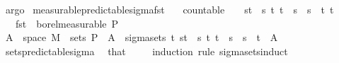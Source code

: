 \begin{isabellebody}
\ argo\isanewline
{}\isamarkupfalse%
%
\endisatagproof
{\isafoldproof}%
%
\isadelimproof
\isanewline
%
\endisadelimproof
\isanewline
{}\isamarkupfalse%
\ measurable{\isacharunderscore}{\kern0pt}predictable{\isacharunderscore}{\kern0pt}sigma{\isacharunderscore}{\kern0pt}fst{\isacharcolon}{\kern0pt}\isanewline
\ \ \ {\isachardoublequoteopen}countable\ {\isasymI}{\isachardoublequoteclose}\ {\isachardoublequoteopen}{\isasymI}\ {\isasymsubseteq}\ {\isacharbraceleft}{\kern0pt}{\isacharbraceleft}{\kern0pt}s{\isacharless}{\kern0pt}{\isachardot}{\kern0pt}{\isachardot}{\kern0pt}t{\isacharbraceright}{\kern0pt}\ {\isacharbar}{\kern0pt}\ s\ t{\isachardot}{\kern0pt}\ t\ {\isasymle}\ s\ {\isasymand}\ s\ {\isacharless}{\kern0pt}\ t{\isacharbraceright}{\kern0pt}{\isachardoublequoteclose}\ {\isachardoublequoteopen}{\isacharbraceleft}{\kern0pt}t\ {\isasymsubseteq}\ {\isacharparenleft}{\kern0pt}{\isasymUnion}{\isasymI}{\isacharparenright}{\kern0pt}{\isachardoublequoteclose}\isanewline
\ \ \ {\isachardoublequoteopen}fst\ {\isasymin}\ borel{\isacharunderscore}{\kern0pt}measurable\ {\isasymSigma}\isactrlsub P{\isachardoublequoteclose}\isanewline
%
\isadelimproof
%
\endisadelimproof
%
\isatagproof
{}\isamarkupfalse%
\ {\isacharminus}{\kern0pt}\isanewline
\ \ \isamarkupfalse%
\ {\isachardoublequoteopen}A\ {\isasymtimes}\ space\ M\ {\isasymin}\ sets\ {\isasymSigma}\isactrlsub P{\isachardoublequoteclose}\ \ {\isachardoublequoteopen}A\ {\isasymin}\ sigma{\isacharunderscore}{\kern0pt}sets\ {\isacharbraceleft}{\kern0pt}t\ {\isacharbraceleft}{\kern0pt}{\isacharbraceleft}{\kern0pt}s{\isacharless}{\kern0pt}{\isachardot}{\kern0pt}{\isachardot}{\kern0pt}t{\isacharbraceright}{\kern0pt}\ {\isacharbar}{\kern0pt}\ s\ t{\isachardot}{\kern0pt}\ t\ {\isasymle}\ s\ {\isasymand}\ s\ {\isacharless}{\kern0pt}\ t{\isacharbraceright}{\kern0pt}{\isachardoublequoteclose}\ \ A\ \isamarkupfalse%
\ sets{\isacharunderscore}{\kern0pt}predictable{\isacharunderscore}{\kern0pt}sigma\ \isamarkupfalse%
\ that\ \isanewline
\ \ \isamarkupfalse%
\ {\isacharparenleft}{\kern0pt}induction\ rule{\isacharcolon}{\kern0pt}\ sigma{\isacharunderscore}{\kern0pt}sets{\isachardot}{\kern0pt}induct{\isacharparenright}{\kern0pt}\isanewline

\end{isabellebody}
